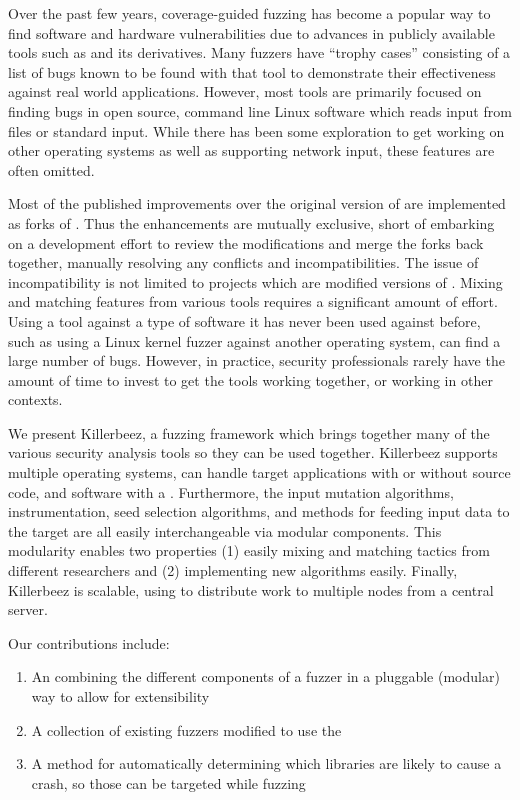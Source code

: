 Over the past few years, coverage-guided fuzzing has become a popular way to
find software and hardware vulnerabilities due to advances in publicly
available tools such as \AFL{}\cite{afl} and its derivatives.\cite{vanhauser} Many
fuzzers have ``trophy cases'' consisting of a list of bugs known to be found with that tool to
demonstrate their effectiveness against real world applications.  However, most
tools are primarily focused on finding bugs in open source, command line Linux
software which reads input from files or standard input. While there has been some
exploration to get \AFL{} working on other operating
systems\cite{aflosx,winafl} as well as supporting network
input,\cite{netafl,preeny} these features are often omitted.

Most of the published improvements over the original version of \AFL{} are
implemented as forks of
\AFL{}.\cite{aflfast,aflgo,fairfuzz,perffuzz,pythia,collafl}
Thus the enhancements are mutually exclusive, short of embarking on a
development effort to review the modifications and merge the forks back
together, manually resolving any conflicts and incompatibilities.  The issue
of incompatibility is not limited to projects which are modified versions of
\AFL{}. Mixing and matching features from various tools requires a significant
amount of effort. Using a tool against a type of software it has never been
used against before, such as using a Linux kernel fuzzer against another
operating system, can find a large number of bugs\cite{anton}.  However, in practice, security
professionals rarely have the amount of time to invest to get the tools working
together, or working in other contexts.

We present Killerbeez, a fuzzing framework which brings together many of the
various security analysis tools so they can be used together.  Killerbeez
supports multiple operating systems, can handle target applications with or
without source code, and software with a \GUI{}.
Furthermore, the input mutation algorithms, instrumentation, seed selection
algorithms, and methods for feeding input data to the target are all easily
interchangeable via modular components.  This modularity enables two
properties (1) easily mixing and matching
tactics from different researchers and (2) implementing new algorithms easily.
Finally, Killerbeez is scalable, using \BOINC{}\cite{boinc} to distribute work
to multiple nodes from a central server.

Our contributions include:
\begin{enumerate}[noitemsep]
\item An \API{} combining the different components of a fuzzer in a pluggable (modular) way to allow for extensibility
\item A collection of existing fuzzers modified to use the \API{}
\item A method for automatically determining which libraries are likely to
	cause a crash, so those can be targeted while fuzzing
\end{enumerate}
